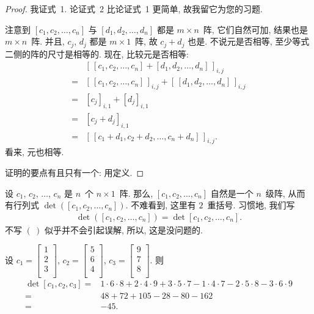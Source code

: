 \begin{proof}
    我证式~1.
    论证式~2 比论证式~1 更简单,
    故我留它为您的习题.

    注意到 \([c_1, c_2, \dots, c_n]\)
    与 \([d_1, d_2, \dots, d_n]\)
    都是 \(m \times n\)~阵,
    它们自然可加,
    结果也是 \(m \times n\)~阵.
    并且, \(c_j\), \(d_j\) 都是 \(m \times 1\)~阵,
    故 \(c_j + d_j\) 也是.
    不说元是否相等, 至少等式二侧的阵的尺寸是相等的.
    现在, 比较元是否相等:
    \begin{align*}
             & [\, [c_1, c_2, \dots, c_n]
        + [d_1, d_2, \dots, d_n] \,]_{i,j}          \\
        = {} & [\, [c_1, c_2, \dots, c_n] \,]_{i,j}
        + [\, [d_1, d_2, \dots, d_n] \,]_{i,j}      \\
        = {} & [c_j]_{i,1} + [d_j]_{i,1}            \\
        = {} & [c_j + d_j]_{i,1}                    \\
        = {} & [\, [c_1 + d_1, c_2 + d_2, \dots,
                        c_n + d_n] \,]_{i,j}.
    \end{align*}
    看来, 元也相等.

    证明的要点有且只有一个: 用定义.
\end{proof}

设 \(c_1\), \(c_2\), \(\dots\), \(c_n\) 是
\(n\)~个 \(n \times 1\)~阵.
那么, \([c_1, c_2, \dots, c_n]\)
自然是一个 \(n\)~级阵,
从而有行列式
\(\det {([c_1, c_2, \dots, c_n])}\).
不难看到, 这里有 \(2\)~重括号.
习惯地, 我们写
\begin{align*}
    \det {([c_1, c_2, \dots, c_n])}
    =
    \det {[c_1, c_2, \dots, c_n]}.
\end{align*}
不写 \(( \ )\) 似乎并不会引起误解,
所以, 这是没问题的.

\begin{example}
    设
    \(c_1 =  \begin{bmatrix}
        1 \\2\\3\\
    \end{bmatrix}\),
    \(c_2 =  \begin{bmatrix}
        5 \\6\\4\\
    \end{bmatrix}\),
    \(c_3 =  \begin{bmatrix}
        9 \\7\\8\\
    \end{bmatrix}\).
    则
    \begin{align*}
        \det {[c_1, c_2, c_3]}
        = {} &
        1 \cdot 6 \cdot 8
        + 2 \cdot 4 \cdot 9
        + 3 \cdot 5 \cdot 7
        - 1 \cdot 4 \cdot 7
        - 2 \cdot 5 \cdot 8
        - 3 \cdot 6 \cdot 9
        \\
        = {} &
        48 + 72 + 105 - 28 - 80 - 162
        \\
        = {} & {-45}.
    \end{align*}
\end{example}

